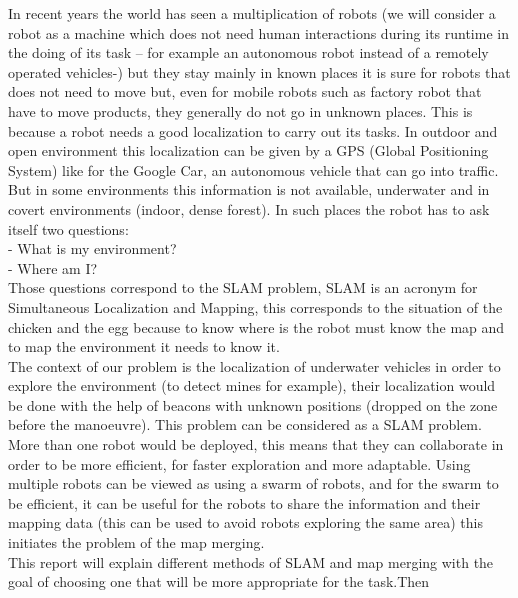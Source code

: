 In recent years the world has seen a multiplication of robots (we will consider a robot as a machine which does not need human interactions during its runtime in the doing of its task – for example an autonomous robot instead of a remotely operated vehicles-) but they stay mainly in known places it is sure for robots that does not need to move but, even for mobile robots such as factory robot that have to move products, they generally do not go in unknown places. This is because a robot needs a good localization to carry out its tasks. In outdoor and open environment this localization can be given by a GPS (Global Positioning System) like for the Google Car, an autonomous vehicle that can go into traffic. But in some environments this information is not available, underwater and in covert environments (indoor, dense forest). In such places the robot has to ask itself two questions:\\

-	What is my environment?\\

-	Where am I?\\

Those questions correspond to the SLAM problem, SLAM is an acronym for Simultaneous Localization and Mapping, this corresponds to the situation of the chicken and the egg because to know where is the robot must know the map and to map the environment it needs to know it.\\

The context of our problem is the localization of underwater vehicles in order to explore the environment (to detect mines for example), their localization would be done with the help of beacons with unknown positions (dropped on the zone before the manoeuvre).  This problem can be considered as a SLAM problem.\\
More than one robot would be deployed, this means that they can collaborate in order to be more efficient, for faster exploration and more adaptable. Using multiple robots can be viewed as using a swarm of robots, and  for the swarm to be efficient, it can be useful for the robots to share the information and their mapping data (this can be used to avoid robots exploring the same area)  this initiates the problem of the map merging.\\

This report will explain different methods of SLAM and map merging with the goal of choosing one that will be more appropriate for the task.Then
